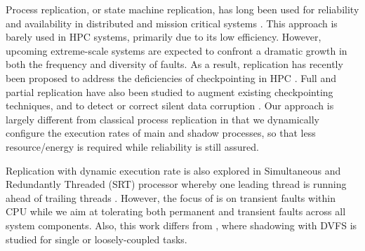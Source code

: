 Process replication, or state machine replication, has long been used for reliability and availability in distributed and mission critical systems \cite{schneider_1990_tutorial}. %
This approach is barely used in HPC systems, primarily due to its low efficiency.
However, upcoming extreme-scale systems are expected to 
confront a dramatic growth in both the frequency and diversity of faults.
As a result,
replication has recently been proposed to address the deficiencies of checkpointing in HPC \cite{Cappello:09:Fault,engelmann2011redundant}. 
Full and partial
replication have also been studied to augment existing checkpointing techniques, and to  
detect or correct silent data corruption \cite{stearly_2012_partial,elliott_2012_cpr,ferreira_sc_2011,fiala_2012_sdc}. %
Our approach is largely different from classical process replication in that we dynamically configure the execution rates of main and shadow processes, so that less resource/energy is required while reliability is still assured.  


Replication with dynamic execution rate is also explored in Simultaneous and Redundantly Threaded (SRT) processor whereby one leading thread is running ahead of trailing threads \cite{reinhardt2000transient}. However, 
the focus of \cite{reinhardt2000transient} is on transient faults within CPU while we aim at tolerating both permanent and transient faults across all system components.
Also, this work differs from \cite{mills_2014_icnc,cui_en7085151,cui_2014_closer}, where shadowing with DVFS is studied for single or loosely-coupled tasks. %
